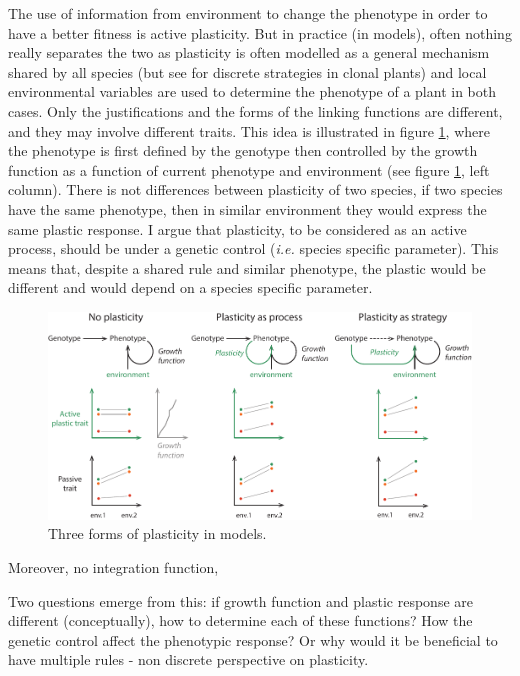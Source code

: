 The use of information from environment to change the phenotype in order to have a better fitness is active plasticity. But in practice (in models)\parencite{maire_plasticity_2013}, often nothing really separates the two as plasticity is often modelled as a general mechanism shared by all species (but see \cite{jablonka_adaptive_1995} for discrete strategies in clonal plants) and local environmental variables are used to determine the phenotype of a plant in both cases. Only the justifications and the forms of the linking functions are different, and they may involve different traits. This idea is illustrated in figure \ref{fig:plastic_function}, where the phenotype is first defined by the genotype then controlled by the growth function as a function of current phenotype and environment (see figure \ref{fig:plastic_function}, left column). There is not differences between plasticity of two species, if two species have the same phenotype, then in similar environment they would express the same plastic response. I argue that plasticity, to be considered as an active process, should be under a genetic control (\textit{i.e.} species specific parameter). This means that, despite a shared rule and similar phenotype, the plastic would be different and would depend on a species specific parameter.


\begin{figure}
    \includegraphics[width=1\linewidth]{./1_Introduction/graphics/plastic_function.pdf}
  \caption[Forms of plasticity in models]{Three forms of plasticity in models. }
  \label{fig:plastic_function}
\end{figure}

Moreover, no integration function, 

Two questions emerge from this: if growth function and plastic response are different (conceptually), how to determine each of these functions?
How the genetic control affect the phenotypic response? Or why would it be beneficial to have multiple rules - non discrete perspective on plasticity.

